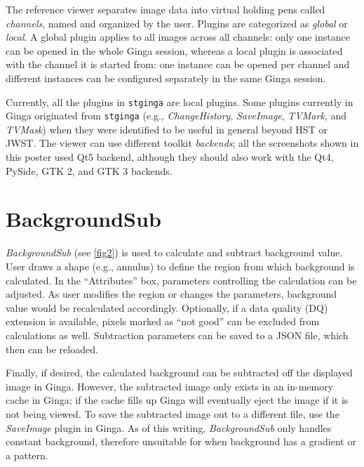 \documentclass[11pt,twoside]{article}
\begin{document}

The reference viewer separates image data into virtual holding pens
called \emph{channels}, named and organized by the user.
Plugins are categorized as \emph{global} or \emph{local}.  A global
plugin applies to all images across all channels: only one instance can
be opened in the whole Ginga session, whereas a local plugin is
associated with the channel it is started from: one instance can be
opened per channel and different instances can be configured separately
in the same Ginga session.

Currently, all the plugins in {\tt stginga} are local plugins.
Some plugins currently in Ginga originated from {\tt stginga}
(e.g., {\em ChangeHistory}, {\em SaveImage}, {\em TVMark}, and {\em TVMask})
when they were identified to be useful in general beyond HST or JWST.
The viewer can use different toolkit \emph{backends};
all the screenshots shown in this poster used Qt5 backend, although they should
also work with the Qt4, PySide, GTK 2, and GTK 3 backends.

\section{BackgroundSub}

{\em BackgroundSub} (see \ref{fig2}) is used to calculate and subtract
background value. User draws a shape (e.g., annulus) to define
the region from which background is calculated. In the ``Attributes'' box,
parameters controlling the calculation can be adjusted.
As user modifies the region or changes the parameters, background value would
be recalculated accordingly.
Optionally, if a data quality (DQ) extension is available, pixels marked as
``not good'' can be excluded from calculations as well.
Subtraction parameters can be saved to a JSON file, which then can be reloaded.


Finally, if desired, the calculated background can be subtracted off
the displayed image in Ginga.
However, the subtracted image only exists in an in-memory cache in Ginga;
if the cache fills up Ginga will eventually eject the image if it is not
being viewed.
To save the subtracted image out to a different file, use the {\em SaveImage}
plugin in Ginga.
As of this writing, {\em BackgroundSub} only handles constant
background, therefore unsuitable for when background has a gradient or a
pattern.
\end{document}
